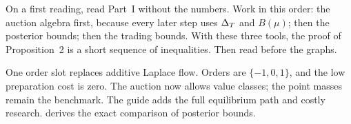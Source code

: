 On a first reading, read Part~I without the numbers. Work in this order: the auction algebra first, because
every later step uses \(\Delta_T\) and \(B(\mu)\); then the posterior bounds; then the trading bounds. With these
three tools, the proof of Proposition~2 is a short sequence of inequalities. Then read 
before the graphs.

\begin{intuition}
One order slot replaces additive Laplace flow.
Orders are \(\{-1,0,1\}\), and the low preparation cost is zero.
The auction now allows value classes; the point masses remain the benchmark.
The guide adds the full equilibrium path and costly research.
 derives the exact comparison of posterior bounds.
\end{intuition}
